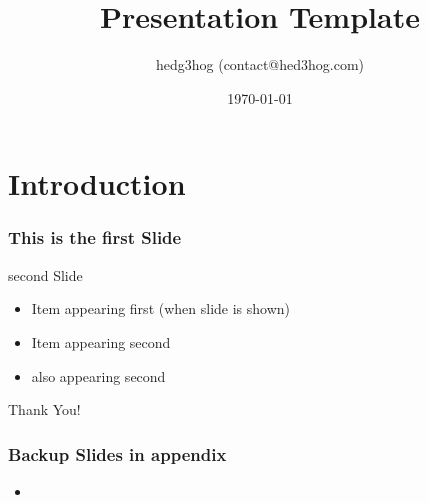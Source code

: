 \documentclass[hyperref={colorlinks=false, breaklinks}]{beamer}
\title{Presentation Template}
\author{hedg3hog (contact@hed3hog.com)}
\subtitle{}
\institute{Your institute
\\

}
\date{\today}
\begin{document}
\maketitle

\section{Introduction}


\begin{frame}
    \frametitle{This is the first Slide}\centering

\end{frame}
\begin{frame}{second Slide}
    \centering
    \begin{itemize}
        \item <1-> Item appearing first (when slide is shown)
        \item <2-> Item appearing second
        \item <2-> also appearing second
    \end{itemize}


\end{frame}

\begin{frame}
    \centering\Huge Thank You!
\end{frame}
\appendix
\begin{frame}
    \frametitle{Backup Slides in appendix}
    \centering
    \begin{itemize}
        \item 
    \end{itemize}
   
\end{frame}



\end{document}
